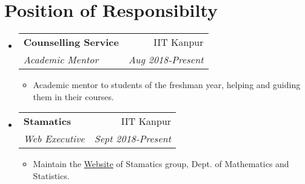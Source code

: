 \documentclass[letterpaper,11pt]{article}
\makeatletter
\newcommand{\resumeSubheading}[4]{
  \vspace{-1pt}\item
    \begin{tabular*}{0.97\textwidth}{l@{\extracolsep{\fill}}r}
      \textbf{#1} & #2 \\
      \textit{\small#3} & \textit{\small #4} \\
    \end{tabular*}\vspace{-5pt}
}
\newcommand{\resumeSubItem}[2]{\textbf{#1}{:#2}}
\newcommand{\resumeSubHeadingListStart}{\begin{itemize}[leftmargin=*]}
\newcommand{\resumeSubHeadingListEnd}{\end{itemize}}
\makeatother
\begin{document}
      
      

\section{Position of Responsibilty}
  \resumeSubHeadingListStart
    \resumeSubheading
      {Counselling Service}{IIT Kanpur}
      {Academic Mentor}{Aug 2018-Present}
      \begin{itemize}
          \item {Academic mentor to students of the freshman year, helping and guiding them in their courses.}\vspace{-2pt}
      \end{itemize}
\resumeSubheading
      {Stamatics}{IIT Kanpur}
      {Web Executive}{Sept 2018-Present}
      \begin{itemize}
          \item {Maintain the {\href{http://www.iitk.ac.in/math/STAMATICS/}{Website}} of Stamatics group, Dept. of Mathematics and Statistics.}\vspace{-2pt}
      \end{itemize}
  \resumeSubHeadingListEnd
\end{document}
